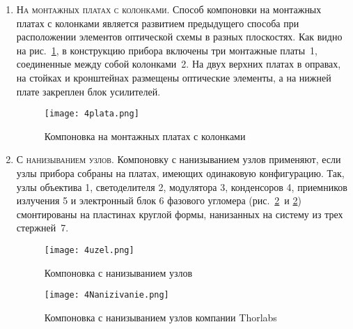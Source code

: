 \begin{enumerate}
	\begin{figure*}[h!]
		\texttt{[image: 4Montage.png]}
		\label{pic:4Montage}
		\caption{ Пример компоновки на монтажной плите интерферометра Маха-Цендера }
	\end{figure*}
	
	\begin{figure*}[h!]
		\texttt{[image: 4LaserShow.png]}
		\caption{ Пример компоновки на монтажной плите проектора для лазерного шоу компании Arctos }
		\label{pic:4LaserShow}
	\end{figure*}
	
	\item \textsc{На монтажных платах с колонками}. 
	Способ компоновки на монтажных платах с колонками является развитием предыдущего способа при расположении элементов оптической схемы в разных плоскостях. 
	Как видно на рис.~\ref{pic:4plata}, в конструкцию прибора включены три монтажные платы~1, соединенные между собой колонками~2. 
	На двух верхних платах в оправах, на стойках и кронштейнах размещены оптические элементы, а на нижней плате закреплен блок усилителей.
	
	\begin{figure}[h!]
		\begin{center}
			\texttt{[image: 4plata.png]}
			\label{pic:4plata}
			\caption{Компоновка на монтажных платах с колонками}
		\end{center}
	\end{figure}
	
	\item \textsc{С нанизыванием узлов}. 
	Компоновку с нанизыванием узлов применяют, если узлы прибора собраны на платах, имеющих одинаковую конфигурацию. 
	Так, узлы объектива 1, светоделителя 2, модулятора 3, конденсоров 4, приемников излучения 5 и электронный блок 6 фазового угломера (рис.~\ref{pic:4uzel}~и \ref{pic:4uzel}) смонтированы на пластинах круглой формы, нанизанных на систему из трех стержней~7.
	
	\begin{figure}[h!]
		\caption{Компоновка с нанизыванием узлов}
		\texttt{[image: 4uzel.png]}
		\label{pic:4uzel}
	\end{figure}
	
	\begin{figure}[h!]
		\begin{center}
			\caption{Компоновка с нанизыванием узлов компании Thorlabs}
			\texttt{[image: 4Nanizivanie.png]}
			\label{pic:4Nanizivanie}
		\end{center}
	\end{figure}
	

\end{enumerate}
